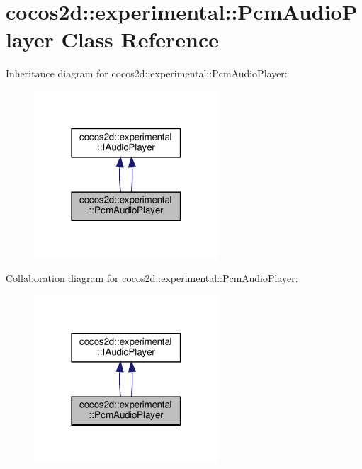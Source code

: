 \hypertarget{classcocos2d_1_1experimental_1_1PcmAudioPlayer}{}\section{cocos2d\+:\+:experimental\+:\+:Pcm\+Audio\+Player Class Reference}
\label{classcocos2d_1_1experimental_1_1PcmAudioPlayer}


Inheritance diagram for cocos2d\+:\+:experimental\+:\+:Pcm\+Audio\+Player\+:
\nopagebreak
\begin{figure}[H]
\begin{center}
\leavevmode
\includegraphics[width=195pt]{classcocos2d_1_1experimental_1_1PcmAudioPlayer__inherit__graph}
\end{center}
\end{figure}


Collaboration diagram for cocos2d\+:\+:experimental\+:\+:Pcm\+Audio\+Player\+:
\nopagebreak
\begin{figure}[H]
\begin{center}
\leavevmode
\includegraphics[width=195pt]{classcocos2d_1_1experimental_1_1PcmAudioPlayer__coll__graph}
\end{center}
\end{figure}
